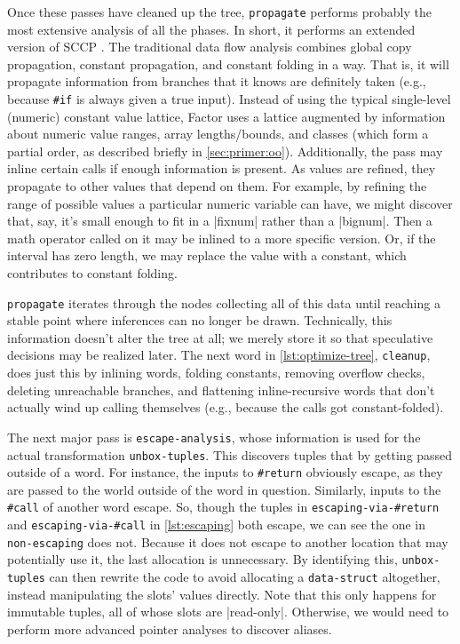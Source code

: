 
Once these passes have cleaned up the tree, \Verb|propagate| performs probably
the most extensive analysis of all the phases.  In short, it performs an
extended version of \gls{SCCP} \autocite{SCCP}.  The traditional data flow
analysis combines global copy propagation, constant propagation, and constant
folding in a  way.  That is, it will propagate information
from branches that it knows are definitely taken (e.g., because \Verb|#if| is
always given a true input).  Instead of using the typical single-level
(numeric) constant value lattice, Factor uses a lattice augmented by
information about numeric value ranges, array lengths/bounds, and classes
(which form a partial order, as described briefly in \cref{sec:primer:oo}).
Additionally, the pass may inline certain calls if enough information is
present.  As values are refined, they propagate to other values that depend on
them.  For example, by refining the range of possible values a particular
numeric variable can have, we might discover that, say, it's small enough to
fit in a \factor|fixnum| rather than a \factor|bignum|.  Then a math operator
called on it may be inlined to a more specific version.  Or, if the interval
has zero length, we may replace the value with a constant, which contributes to
constant folding.

\Verb|propagate| iterates through the nodes collecting all of this data until
reaching a stable point where inferences can no longer be drawn.  Technically,
this information doesn't alter the tree at all; we merely store it so that
speculative decisions may be realized later.  The next word in
\vref{lst:optimize-tree}, \Verb|cleanup|, does just this by inlining words,
folding constants, removing overflow checks, deleting unreachable branches, and
flattening inline-recursive words that don't actually wind up calling
themselves (e.g., because the calls got constant-folded).

The next major pass is \Verb|escape-analysis|, whose information is used for
the actual transformation \Verb|unbox-tuples|.  This discovers tuples that
 by getting passed outside of a word.  For instance, the inputs to
\Verb|#return| obviously escape, as they are passed to the world outside of the
word in question.  Similarly, inputs to the \Verb|#call| of another word
escape.  So, though the tuples in \Verb|escaping-via-#return| and
\Verb|escaping-via-#call| in \vref{lst:escaping} both escape, we can see the
one in \Verb|non-escaping| does not.  Because it does not escape to another
location that may potentially use it, the last allocation is unnecessary.  By
identifying this, \Verb|unbox-tuples| can then rewrite the code to avoid
allocating a \Verb|data-struct| altogether, instead manipulating the slots'
values directly.  Note that this only happens for immutable tuples, all of
whose slots are \factor|read-only|.  Otherwise, we would need to perform more
advanced pointer analyses to discover aliases.

